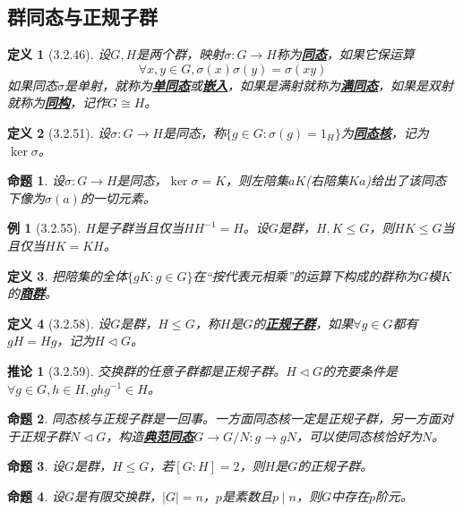 \documentclass[landscape, a4paper]{article}
\theoremstyle{compact}
\newtheorem{example}{例}
\newtheorem{corollary}{推论}
\newtheorem{definition}{定义}
\newtheorem{proposition}{命题}
\def\obj#1{\textbf{\uline{#1}}}
\def\le{\leqslant}
\begin{document}
\begin{multicols}{3}
\subsection{群同态与正规子群}
\begin{definition}[3.2.46]
	设$G, H$是两个群，映射$\sigma: G \to H$称为\obj{同态}，如果它保运算
	$$\forall x, y \in G, \sigma(x)\sigma(y) = \sigma(xy)$$如果同态$\sigma$是单射，就称为\obj{单同态}或\obj{嵌入}，如果是满射就称为\obj{满同态}，如果是双射就称为\obj{同构}，记作$G \cong H$。
\end{definition}
\begin{definition}[3.2.51]
	设$\sigma: G \to H$是同态，称$\{g \in G: \sigma(g) = 1_H\}$为\obj{同态核}，记为$\ker \sigma$。
\end{definition}
\begin{proposition}
	设$\sigma: G \to H$是同态，$\ker \sigma = K$，则左陪集$aK$(右陪集$Ka$)给出了该同态下像为$\sigma(a)$的一切元素。
\end{proposition}
\begin{example}[3.2.55]
	$H$是子群当且仅当$HH^{-1} = H$。设$G$是群，$H, K \le G$，则$HK \le G$当且仅当$HK = KH$。
\end{example}
\begin{definition}
	把陪集的全体$\{gK: g \in G\}$在“按代表元相乘”的运算下构成的群称为$G$模$K$的\obj{商群}。
\end{definition}
\begin{definition}[3.2.58]
	设$G$是群，$H \le G$，称$H$是$G$的\obj{正规子群}，如果$\forall g \in G$都有$gH = Hg$，记为$H \triangleleft G$。
\end{definition}
\begin{corollary}[3.2.59]
	交换群的任意子群都是正规子群。$H \triangleleft G$的充要条件是$\forall g \in G, h \in H, ghg^{-1} \in H$。
\end{corollary}
\begin{proposition}
	同态核与正规子群是一回事。一方面同态核一定是正规子群，另一方面对于正规子群$N \triangleleft G$，构造\obj{典范同态}$G \to G/N: g \to gN$，可以使同态核恰好为$N$。
\end{proposition}
\begin{proposition}
	设$G$是群，$H \le G$，若$[G:H] = 2$，则$H$是$G$的正规子群。
\end{proposition}
\begin{proposition}
	设$G$是有限交换群，$|G| = n$，$p$是素数且$p \mid n$，则$G$中存在$p$阶元。
\end{proposition}


\end{multicols}
\end{document}
